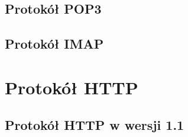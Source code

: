 \documentclass{article}
\begin{document}
\newpage
\subsection*{Protokół POP3}

\newpage 
\subsection*{Protokół IMAP}

\newpage 
\section{Protokół HTTP}

\subsection*{Protokół HTTP w wersji 1.1}
\end{document}
